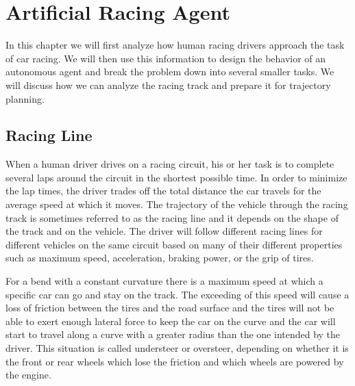 \chapter{Artificial Racing Agent}
\label{chapter:agent}

In this chapter we will first analyze how human racing drivers approach the task of car racing. We will then use this information to design the behavior of an autonomous agent and break the problem down into several smaller tasks. We will discuss how we can analyze the racing track and prepare it for trajectory planning.

\section{Racing Line}
\label{sec:racing_line}

When a human driver drives on a racing circuit, his or her task is to complete several laps around the circuit in the shortest possible time. In order to minimize the lap times, the driver trades off the total distance the car travels for the average speed at which it moves. The trajectory of the vehicle through the racing track is sometimes referred to as the racing line and it depends on the shape of the track and on the vehicle. The driver will follow different racing lines for different vehicles on the same circuit based on many of their different properties such as maximum speed, acceleration, braking power, or the grip of tires.

For a bend with a constant curvature there is a maximum speed at which a specific car can go and stay on the track. The exceeding of this speed will cause a loss of friction between the tires and the road surface and the tires will not be able to exert enough lateral force to keep the car on the curve and the car will start to travel along a curve with a greater radius than the one intended by the driver. This situation is called understeer or oversteer, depending on whether it is the front or rear wheels which lose the friction and which wheels are powered by the engine.

